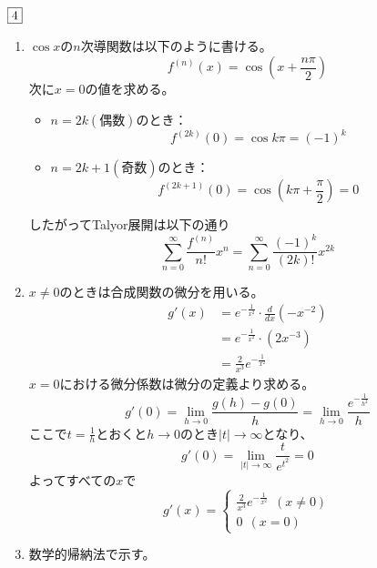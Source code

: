 \begin{souanswer} %
	$\fbox{4}$
\begin{enumerate}
	\item $\cos{x}$の$n$次導関数は以下のように書ける。
\begin{equation*}
	f^{(n)}(x)= \cos{\left(x+ \frac{n\pi}{2}\right)}
\end{equation*}
	次に$x= 0$の値を求める。
\begin{itemize}
	\item $n= 2k(偶数)$のとき：
\begin{equation*}
	f^{(2k)}(0)= \cos{k\pi}= (-1)^k
\end{equation*}
 
	\item $n= 2k+ 1(奇数)$のとき：
\begin{equation*}
	f^{(2k+ 1)}(0)= \cos{\left(k\pi+ \frac{\pi}{2}\right)}= 0
\end{equation*}
\end{itemize}
	したがってTalyor展開は以下の通り
\begin{equation*}
	\sum_{n= 0}^\infty \frac{f^{(n)}}{n!}x^n= \sum_{n= 0}^\infty \frac{(-1)^k}{(2k)!}x^{2k}
\end{equation*}

	\item $x\ne 0$のときは合成関数の微分を用いる。
\begin{align*}
	g'(x)
	&= e^{-\frac{1}{x^2}}\cdot \frac{d}{dx}(-x^{-2})\\
	&= e^{-\frac{1}{x^2}}\cdot (2x^{-3})\\
	&= \frac{2}{x^3}e^{-\frac{1}{x^2}}
\end{align*}
	$x= 0$における微分係数は微分の定義より求める。
\begin{equation*}
	g'(0)= \lim_{h\to 0}\frac{g(h)- g(0)}{h}= \lim_{h\to 0} \frac{e^{-\frac{1}{h^2}}}{h}
\end{equation*}
	ここで$t= \frac{1}{h}$とおくと$h\to 0$のとき$|t|\to \infty$となり、
\begin{equation*}
	g'(0)= \lim_{|t|\to \infty} \frac{t}{e^{t^2}}= 0
\end{equation*}
	よってすべての$x$で
\begin{equation*}
	g'(x)= 
\begin{cases}
	\frac{2}{x^3}e^{-\frac{1}{x^2}}\ \ (x\ne 0)\\
0\ \ (x= 0)
\end{cases}
\end{equation*}
	\item\label{step:R7-2nd数学的帰納法} 数学的帰納法で示す。
\end{enumerate}
\end{souanswer}
